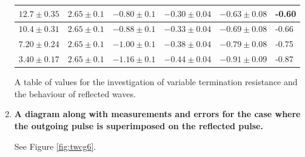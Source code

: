 \begin{enumerate}
\begin{maintable}[ht]
\begin{tabular}{|l|l|l|l|l|l|}
$12.7\pm0.35$                          & $2.65\pm0.1$                   & $-0.80\pm0.1$                  & $-0.30\pm0.04$                  & $-0.63\pm0.08$                       & -0.60                                  \\ \hline
$10.4\pm0.31$                          & $2.65\pm0.1$                   & $-0.88\pm0.1$                  & $-0.33\pm0.04$                  & $-0.69\pm0.08$                       & -0.66                                  \\ \hline
$7.20\pm0.24$                          & $2.65\pm0.1$                   & $-1.00\pm0.1$                  & $-0.38\pm0.04$                  & $-0.79\pm0.08$                       & -0.75                                  \\ \hline
$3.40\pm0.17$                          & $2.65\pm0.1$                   & $-1.16\pm0.1$                  & $-0.44\pm0.04$                  & $-0.91\pm0.09$                       & -0.87                                  \\ \hline
\end{tabular}
\caption{A table of values for the investigation of variable termination resistance and the behaviour of reflected waves.}
\label{tab:twcg1}
\end{maintable}



\item {\bf A diagram along with measurements and errors for the case where the outgoing pulse is superimposed on the reflected pulse.}\newline

See Figure \ref{fig:twcg6}.


\end{enumerate}

